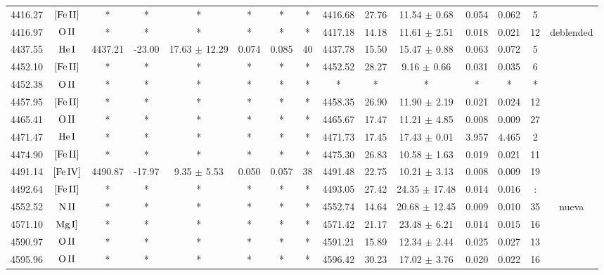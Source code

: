 \documentclass{article}
\begin{document}
\begin{table*}
\begin{adjustbox}{width=\textwidth}
\begin{tabular}{ccccccccccccccc}
4416.27 & $\mbox{[Fe}\thinspace \mbox{II]}$ & * & * & * & * & * & * & 4416.68 & 27.76 & 11.54 $\pm$ 0.68 & 0.054 & 0.062 & 5 &  \\
4416.97 & $\mbox{O}\thinspace \mbox{II}$ & * & * & * & * & * & * & 4417.18 & 14.18 & 11.61 $\pm$ 2.51 & 0.018 & 0.021 & 12 &  deblended \\
4437.55 & $\mbox{He}\thinspace \mbox{I}$ & 4437.21 & -23.00 & 17.63 $\pm$ 12.29 & 0.074 & 0.085 & 40 & 4437.78 & 15.50 & 15.47 $\pm$ 0.88 & 0.063 & 0.072 & 5 &  \\
4452.10 & $\mbox{[Fe}\thinspace \mbox{II]}$ & * & * & * & * & * & * & 4452.52 & 28.27 & 9.16 $\pm$ 0.66 & 0.031 & 0.035 & 6 &  \\
4452.38 & $\mbox{O}\thinspace \mbox{II}$ & * & * & * & * & * & * & * & * & * & * & * & * &  \\
4457.95 & $\mbox{[Fe}\thinspace \mbox{II]}$ & * & * & * & * & * & * & 4458.35 & 26.90 & 11.90 $\pm$ 2.19 & 0.021 & 0.024 & 12 &  \\
4465.41 & $\mbox{O}\thinspace \mbox{II}$ & * & * & * & * & * & * & 4465.67 & 17.47 & 11.21 $\pm$ 4.85 & 0.008 & 0.009 & 27 &  \\
4471.47 & $\mbox{He}\thinspace \mbox{I}$ & * & * & * & * & * & * & 4471.73 & 17.45 & 17.43 $\pm$ 0.01 & 3.957 & 4.465 & 2 &  \\
4474.90 & $\mbox{[Fe}\thinspace \mbox{II]}$ & * & * & * & * & * & * & 4475.30 & 26.83 & 10.58 $\pm$ 1.63 & 0.019 & 0.021 & 11 &  \\
4491.14 & $\mbox{[Fe}\thinspace \mbox{IV]}$ & 4490.87 & -17.97 & 9.35 $\pm$ 5.53 & 0.050 & 0.057 & 38 & 4491.48 & 22.75 & 10.21 $\pm$ 3.13 & 0.008 & 0.009 & 19 &  \\
4492.64 & $\mbox{[Fe}\thinspace \mbox{II]}$ & * & * & * & * & * & * & 4493.05 & 27.42 & 24.35 $\pm$ 17.48 & 0.014 & 0.016 & : &  \\
4552.52 & $\mbox{N}\thinspace \mbox{II}$ & * & * & * & * & * & * & 4552.74 & 14.64 & 20.68 $\pm$ 12.45 & 0.009 & 0.010 & 35 &  nueva \\
4571.10 & $\mbox{Mg}\thinspace \mbox{I]}$ & * & * & * & * & * & * & 4571.42 & 21.17 & 23.48 $\pm$ 6.21 & 0.014 & 0.015 & 16 &  \\
4590.97 & $\mbox{O}\thinspace \mbox{II}$ & * & * & * & * & * & * & 4591.21 & 15.89 & 12.34 $\pm$ 2.44 & 0.025 & 0.027 & 13 &  \\
4595.96 & $\mbox{O}\thinspace \mbox{II}$ & * & * & * & * & * & * & 4596.42 & 30.23 & 17.02 $\pm$ 3.76 & 0.020 & 0.022 & 16 &  \\

\end{tabular}
\end{adjustbox}
\end{table*}
\end{document}
